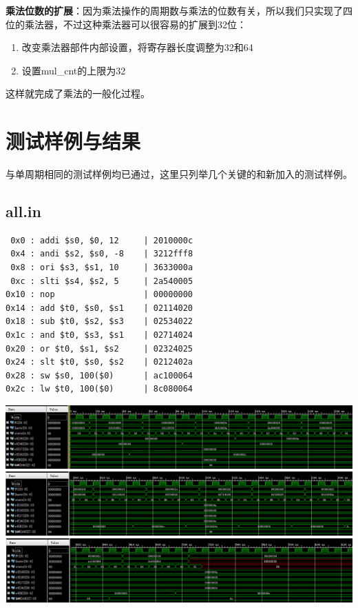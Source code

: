 \documentclass[12pt]{article} %
\begin{document}
\begin{sloppypar}
{\bf 乘法位数的扩展}：因为乘法操作的周期数与乘法的位数有关，所以我们只实现了四位的乘法器，不过这种乘法器可以很容易的扩展到32位：
\begin{enumerate}
\item 改变乘法器部件内部设置，将寄存器长度调整为32和64
\item 设置mul\_cnt的上限为32
\end{enumerate}
这样就完成了乘法的一般化过程。

\newpage
\section{测试样例与结果}

与单周期相同的测试样例均已通过，这里只列举几个关键的和新加入的测试样例。

\subsection{all.in}

\begin{lstlisting}
 0x0 : addi $s0, $0, 12     | 2010000c
 0x4 : andi $s2, $s0, -8    | 3212fff8
 0x8 : ori $s3, $s1, 10     | 3633000a
 0xc : slti $s4, $s2, 5     | 2a540005
0x10 : nop                  | 00000000
0x14 : add $t0, $s0, $s1    | 02114020
0x18 : sub $t0, $s2, $s3    | 02534022
0x1c : and $t0, $s3, $s1    | 02714024
0x20 : or $t0, $s1, $s2     | 02324025
0x24 : slt $t0, $s0, $s2    | 0212402a
0x28 : sw $s0, 100($0)      | ac100064
0x2c : lw $t0, 100($0)      | 8c080064
\end{lstlisting} 
\noindent
\includegraphics[width =\linewidth]{figure/all1.png}
\includegraphics[width =\linewidth]{figure/all2.png}
\includegraphics[width =\linewidth]{figure/all3.png}


\end{sloppypar}
\end{document}
